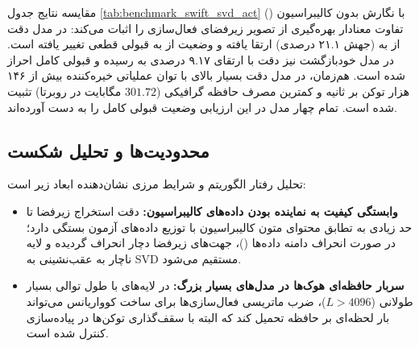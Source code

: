 مقایسه نتایج جدول \ref{tab:benchmark_swift_svd_act} با نگارش بدون کالیبراسیون () تفاوت معنادار بهره‌گیری از تصویر زیرفضای فعال‌سازی را اثبات می‌کند: در مدل  دقت از  به  (جهش ۲۱.۱ درصدی) ارتقا یافته و وضعیت از  به قبولی قطعی  تغییر یافته است. در مدل خودبازگشت  نیز دقت با ارتقای ۹.۱۷ درصدی به  رسیده و قبولی کامل  احراز شده است. هم‌زمان، در مدل  دقت بسیار بالای  با توان عملیاتی خیره‌کننده بیش از ۱۴۶ هزار توکن بر ثانیه و کمترین مصرف حافظه گرافیکی ($301.72$ مگابایت در روبرتا) تثبیت شده است. تمام چهار مدل در این ارزیابی وضعیت قبولی کامل  را به دست آورده‌اند.

\subsection{محدودیت‌ها و تحلیل شکست}
تحلیل رفتار الگوریتم و شرایط مرزی نشان‌دهنده ابعاد زیر است:
\begin{itemize}
    \item \textbf{وابستگی کیفیت به نماینده بودن داده‌های کالیبراسیون:} دقت استخراج زیرفضا تا حد زیادی به تطابق محتوای متون کالیبراسیون با توزیع داده‌های آزمون بستگی دارد؛ در صورت انحراف دامنه داده‌ها ()، جهت‌های زیرفضا دچار انحراف گردیده و لایه ناچار به عقب‌نشینی به SVD مستقیم می‌شود.
    \item \textbf{سربار حافظه‌ای هوک‌ها در مدل‌های بسیار بزرگ:} در لایه‌های با طول توالی بسیار طولانی ($L > 4096$)، ضرب ماتریسی فعال‌سازی‌ها برای ساخت کوواریانس می‌تواند بار لحظه‌ای بر حافظه تحمیل کند که البته با سقف‌گذاری توکن‌ها در پیاده‌سازی کنترل شده است.
\end{itemize}
